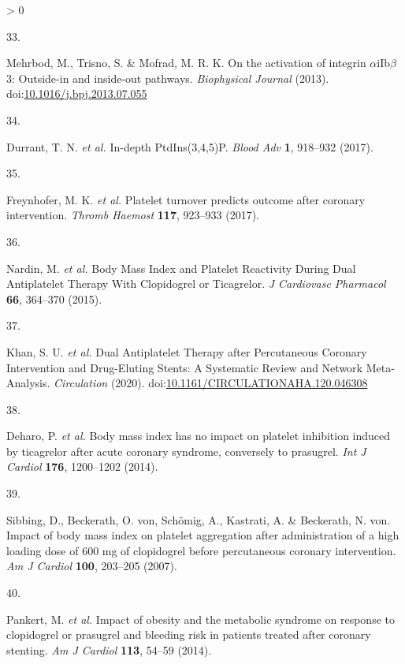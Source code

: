 \documentclass[11pt,twoside]{bristolthesis}
\newlength{\cslhangindent}
\newlength{\csllabelwidth}
\newenvironment{CSLReferences}[2] %
 {%
  \setlength{\parindent}{0pt}
  \ifodd #1 \everypar{\setlength{\hangindent}{\cslhangindent}}\ignorespaces\fi
  \ifnum #2 > 0
  \setlength{\parskip}{#2\baselineskip}
  \fi
 }%
 {}
\newcommand{\CSLLeftMargin}[1]{\parbox[t]{\csllabelwidth}{#1}}
\newcommand{\CSLRightInline}[1]{\parbox[t]{\linewidth - \csllabelwidth}{#1}\break}
\begin{document}
\begin{CSLReferences}{0}{0}
\leavevmode\hypertarget{ref-Mehrbod2013}{}%
\CSLLeftMargin{33. }
\CSLRightInline{Mehrbod, M., Trisno, S. \& Mofrad, M. R. K. {On the activation of integrin \(\alpha\)iIb\(\beta\)3: Outside-in and inside-out pathways}. \emph{Biophysical Journal} (2013). doi:\href{https://doi.org/10.1016/j.bpj.2013.07.055}{10.1016/j.bpj.2013.07.055}}

\leavevmode\hypertarget{ref-Durrant2017}{}%
\CSLLeftMargin{34. }
\CSLRightInline{Durrant, T. N. \emph{et al.} {In-depth PtdIns(3,4,5)P}. \emph{Blood Adv} \textbf{1}, 918--932 (2017).}

\leavevmode\hypertarget{ref-Freynhofer2017a}{}%
\CSLLeftMargin{35. }
\CSLRightInline{Freynhofer, M. K. \emph{et al.} {Platelet turnover predicts outcome after coronary intervention}. \emph{Thromb Haemost} \textbf{117}, 923--933 (2017).}

\leavevmode\hypertarget{ref-Nardin2015}{}%
\CSLLeftMargin{36. }
\CSLRightInline{Nardin, M. \emph{et al.} {Body Mass Index and Platelet Reactivity During Dual Antiplatelet Therapy With Clopidogrel or Ticagrelor}. \emph{J Cardiovasc Pharmacol} \textbf{66}, 364--370 (2015).}

\leavevmode\hypertarget{ref-Khan2020}{}%
\CSLLeftMargin{37. }
\CSLRightInline{Khan, S. U. \emph{et al.} {Dual Antiplatelet Therapy after Percutaneous Coronary Intervention and Drug-Eluting Stents: A Systematic Review and Network Meta-Analysis}. \emph{Circulation} (2020). doi:\href{https://doi.org/10.1161/CIRCULATIONAHA.120.046308}{10.1161/CIRCULATIONAHA.120.046308}}

\leavevmode\hypertarget{ref-Deharo2014}{}%
\CSLLeftMargin{38. }
\CSLRightInline{Deharo, P. \emph{et al.} {Body mass index has no impact on platelet inhibition induced by ticagrelor after acute coronary syndrome, conversely to prasugrel}. \emph{Int J Cardiol} \textbf{176}, 1200--1202 (2014).}

\leavevmode\hypertarget{ref-Sibbing2007}{}%
\CSLLeftMargin{39. }
\CSLRightInline{Sibbing, D., Beckerath, O. von, Schömig, A., Kastrati, A. \& Beckerath, N. von. {Impact of body mass index on platelet aggregation after administration of a high loading dose of 600 mg of clopidogrel before percutaneous coronary intervention}. \emph{Am J Cardiol} \textbf{100}, 203--205 (2007).}

\leavevmode\hypertarget{ref-Pankert2014}{}%
\CSLLeftMargin{40. }
\CSLRightInline{Pankert, M. \emph{et al.} {Impact of obesity and the metabolic syndrome on response to clopidogrel or prasugrel and bleeding risk in patients treated after coronary stenting}. \emph{Am J Cardiol} \textbf{113}, 54--59 (2014).}


\end{CSLReferences}
\end{document}
